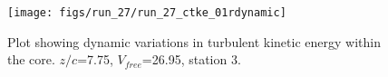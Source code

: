 \begin{figure}[H]
\centering
\texttt{[image: figs/run\_27/run\_27\_ctke\_01rdynamic]}
\caption{Plot showing dynamic variations in turbulent kinetic energy within the core. $z/c$=7.75, $V_{free}$=26.95, station 3.}
\label{fig:run_27_ctke_01rdynamic}
\end{figure}


